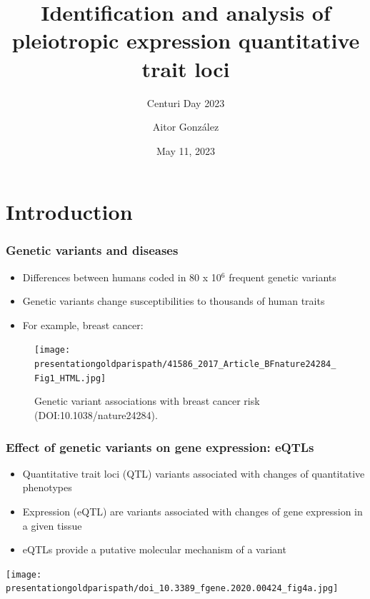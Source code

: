 \documentclass{beamer}
\title{Identification and analysis of pleiotropic expression quantitative trait loci}
\subtitle{Centuri Day 2023}
\author{Aitor Gonz\'alez}
\institute{Aix Marseille Univ, INSERM, TAGC}
\date{May 11, 2023}
\newcommand*{\presentationgoldparispath}{../presentation_230120_gold2022_paris/fig/}%
\begin{document}
    \begin{frame}

        \titlepage

    \end{frame}


    \section{Introduction} %


    \begin{frame}
        \frametitle{Genetic variants and diseases}

        \begin{itemize}
            \item Differences between humans coded in 80 x 10$^6$ frequent genetic variants
            \item Genetic variants change susceptibilities to thousands of human traits
            \item For example, breast cancer:
        \end{itemize}
        \begin{figure}
            \begin{center}
                \texttt{[image: \\presentationgoldparispath/41586\_2017\_Article\_BFnature24284\_Fig1\_HTML.jpg]}
            \end{center}
            \caption{Genetic variant associations with breast cancer risk (DOI:10.1038/nature24284).}
        \end{figure}

    \end{frame}

    \begin{frame}
        \frametitle{Effect of genetic variants on gene expression: eQTLs}

        \begin{itemize}
            \item Quantitative trait loci (QTL) variants associated with changes of quantitative phenotypes
            \item Expression (eQTL) are variants associated with changes of gene expression in a given tissue
            \item eQTLs provide a putative molecular mechanism of a variant
        \end{itemize}

        \texttt{[image: \\presentationgoldparispath/doi\_10.3389\_fgene.2020.00424\_fig4a.jpg]}

        \let\thefootnote\relax{}
    \end{frame}
\end{document}

